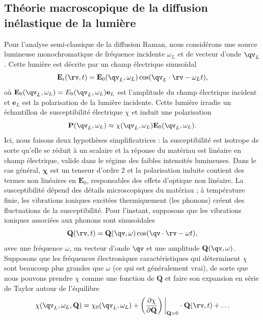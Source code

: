 \subsection{Théorie macroscopique de la diffusion inélastique de la lumière}
Pour l'analyse semi-classique de la diffusion Raman, nous considérons une source lumineuse monochromatique de fréquence incidente $\omega_L$ et de vecteur d'onde $\qv_L$. Cette lumière est décrite par un champ électrique sinusoïdal
\begin{equation}
    \mathbf{E}_i(\rv,t) = \mathbf{E}_0(\qv_L,\omega_L)\cos(\qv_L\cdot\rv-\omega_L t),
\end{equation}
où $\mathbf{E}_0(\qv_L, \omega_L)=E_0(\qv_L,\omega_L)\mathbf{e}_L$ est l'amplitude du champ électrique incident et $\mathbf{e}_L$ est la polarisation de la lumière incidente. Cette lumière irradie un échantillon de susceptibilité électrique $\chi$ et induit une polarisation 
\begin{equation}
    \mathbf{P}(\qv_L,\omega_L) \approx \chi(\qv_L,\omega_L)\mathbf{E}_0(\qv_L,\omega_L).\label{eqn:P_ind}
\end{equation}
Ici, nous faisons deux hypothèses simplificatrices : la susceptibilité est isotrope de sorte qu'elle se réduit à un scalaire et la réponse du matériau est linéaire en champ électrique, valide dans le régime des faibles intensités lumineuses. Dans le cas général, $\bm{\chi}$ est un tenseur d'ordre 2 et la polarisation induite contient des termes non linéaires en $\mathbf{E}_0$, responsables des effets d'optique non linéaire. La susceptibilité dépend des détails microscopiques du matériau ; à température finie, les vibrations ioniques excitées thermiquement (les phonons) créent des fluctuations de la susceptibilité. Pour l'instant, supposons que les vibrations ioniques associées aux phonons sont sinusoïdales
\begin{equation}
    \mathbf{Q}(\rv,t)=\mathbf{Q}(\qv, \omega)\cos(\qv\cdot\rv-\omega t),\label{eqn:Q}
\end{equation}
avec une fréquence $\omega$, un vecteur d'onde $\qv$ et une amplitude $\mathbf{Q}(\qv,\omega)$. Supposons que les fréquences électroniques caractéristiques qui déterminent $\chi$ sont beaucoup plus grandes que $\omega$ (ce qui est généralement vrai), de sorte que nous pouvons prendre $\chi$ comme une fonction de $\mathbf{Q}$ et faire son expansion en série de Taylor autour de l'équilibre
\begin{equation}
    \chi(\qv_L,\omega_L,\mathbf{Q}) = \chi_0(\qv_L,\omega_L) + \left(\frac{\partial \chi}{\partial \mathbf{Q}}\right)\bigg\rvert_{\mathbf{Q}=0}\cdot\mathbf{Q}(\rv,t)+\dots\label{eqn:chi_exp}
\end{equation}
